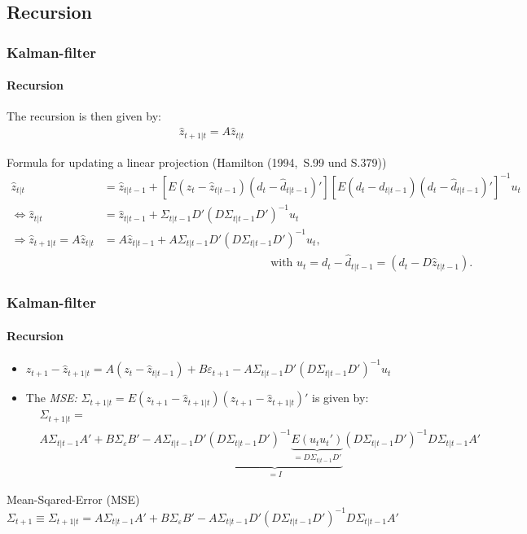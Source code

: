 \documentclass[handout]{beamer}  %
\begin{document}
\subsection{Recursion}
\begin{frame}\frametitle{Kalman-filter}\framesubtitle{Recursion}
	The recursion is then given by:
	\begin{align*} {\widehat{z}_{t+1|t}} = {A} {\widehat{z}_{t|t}} \end{align*}
	\begin{block}{\scriptsize Formula for updating a linear projection (Hamilton (1994,~S.99 und S.379))}
		\scriptsize\begin{align*}
			{\widehat{z}_{t|t}} &= {\widehat{z}_{t|t-1}}  +\left[E({z_t}-{\widehat{z}_{t|t-1}})({d_t}-{\widehat{d}_{t|t-1}})'\right] \left[E({d_t}-{\widehat{d}_{t|t-1}})({d_t}-{\widehat{d}_{t|t-1}})'\right]^{-1} {u_t}\\
			\Leftrightarrow {\widehat{z}_{t|t}}&= {\widehat{z}_{t|t-1}}+ {\Sigma_{t|t-1}} {D'} \left({D}{\Sigma_{t|t-1}}{D'}\right)^{-1} {u_t}\\
			\Rightarrow {\widehat{z}_{t+1|t}} = {A} {\widehat{z}_{t|t}} &={A} {\widehat{z}_{t|t-1}}+ {A}{\Sigma_{t|t-1}} {D'} \left({D}{\Sigma_{t|t-1}}{D'}\right)^{-1} {u_t}, \\
			&\qquad\qquad\qquad\qquad\qquad\qquad\qquad~~~ \text{with } {u_t} = {d_t} - {\widehat{d}_{t|t-1}} = ({d_t} - D{\widehat{z}_{t|t-1}}).
		\end{align*}
	\end{block}
\end{frame}

\begin{frame}\frametitle{Kalman-filter}\framesubtitle{Recursion}
	\begin{itemize}
		\item ${z_{t+1}} - {\widehat{z}_{t+1|t}} = {A}\left({z_{t}} - {\widehat{z}_{t|t-1}}\right) + {B} {\varepsilon_{t+1}} - {A}{\Sigma_{t|t-1}} {D'} \left({D}{\Sigma_{t|t-1}}{D'}\right)^{-1} {u_t}$
		\item The \emph{MSE: } ${\Sigma_{t+1|t} }= E\left({z_{t+1}} - {\widehat{z}_{t+1|t}}\right)\left({z_{t+1}} - {\widehat{z}_{t+1|t}}\right)'$ is given by:
		\scriptsize\begin{align*}
			&{\Sigma_{t+1|t} }=\\
			& {A} {\Sigma_{t|t-1}} {A'} + {B} {\Sigma_\varepsilon} {B}' - {A}{\Sigma_{t|t-1}} {D'} \underbrace{\left({D}{\Sigma_{t|t-1}}{D'}\right)^{-1} \underbrace{E({u_t} {u_t'})}_{={D} {\Sigma_{t|t-1}} {D'}}}_{={I}}
			\left({D}{\Sigma_{t|t-1}}{D'}\right)^{-1} {D} {\Sigma_{t|t-1}} {A}'
		\end{align*}
	\end{itemize}
	\scriptsize\begin{block}{Mean-Sqared-Error (MSE)}\centering
		$
		{\Sigma_{t+1} } \equiv {\Sigma_{t+1|t} }      = {A} {\Sigma_{t|t-1}} {A'} + {B} {\Sigma_\varepsilon} {B}' - {A}{\Sigma_{t|t-1}} {D'} \left({D}{\Sigma_{t|t-1}}{D'}\right)^{-1} {D} {\Sigma_{t|t-1}}{A}'
		$
	\end{block}
\end{frame}
\end{document}
